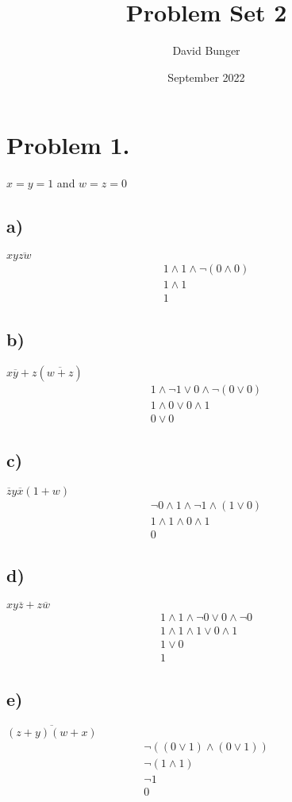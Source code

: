 \documentclass{article}
\title{Problem Set 2}
\author{David Bunger}
\date{September 2022}
\begin{document}
\maketitle

\section*{Problem 1.}
$x = y = 1$ and $w = z = 0$
\subsection*{a)} 
$xy\overline{zw}$
\begin{gather*}
    1\land 1\land \neg (0 \land 0) \\ 
    1\land1\\
    1
\end{gather*}
\subsection*{b)} 
$x\overline{y}+z(\overline{w+z})$
\begin{gather*}
    1 \land \neg1\lor0\land\neg(0\lor0)\\
    1\land0\lor0\land1\\
    0\lor0
\end{gather*}
\subsection*{c)} 
$\overline{z}y\overline{x}(1+w)$
\begin{gather*}
    \neg0\land1\land\neg1\land(1\lor0)\\
    1\land1\land0\land1\\
    0
\end{gather*}
\clearpage
\subsection*{d)} 
$xy\overline{z}+z\overline{w}$
\begin{gather*}
    1\land1\land\neg0\lor0\land\neg0\\
    1\land1\land1\lor0\land1\\
    1\lor0\\
    1
\end{gather*}
\subsection*{e)} 
$\overline{(z+y)(w+x)}$
\begin{gather*}
    \neg((0\lor1)\land(0\lor1))\\
    \neg(1\land1)\\
    \neg1\\
    0
\end{gather*}
\end{document}
